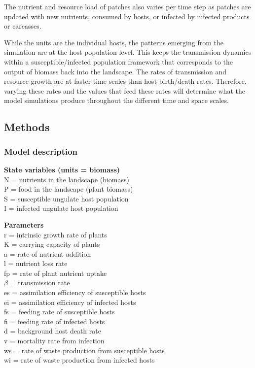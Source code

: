 \documentclass[10,portrait]{article}
\begin{document}
The nutrient and resource load of patches also varies per time step as
patches are updated with new nutrients, consumed by hosts, or infected
by infected products or carcasses.

While the units are the individual hosts, the patterns emerging from the
simulation are at the host population level. This keeps the transmission
dynamics within a susceptible/infected population framework that
corresponds to the output of biomass back into the landscape. The rates
of transmission and resource growth are at faster time scales than host
birth/death rates. Therefore, varying these rates and the values that
feed these rates will determine what the model simulations produce
throughout the different time and space scales.

\subsection{Methods}\label{methods}

\subsubsection{Model description}\label{model-description}

\textbf{State variables (units = biomass)}\\
N = nutrients in the landscape (biomass)\\
P = food in the landscape (plant biomass)\\
S = susceptible ungulate host population\\
I = infected ungulate host population

\textbf{Parameters}\\
r = intrinsic growth rate of plants\\
K = carrying capacity of plants\\
a = rate of nutrient addition\\
l = nutrient loss rate\\
fp = rate of plant nutrient uptake\\
\(\beta\) = transmission rate\\
es = assimilation efficiency of susceptible hosts\\
ei = assimilation efficiency of infected hosts\\
fs = feeding rate of susceptible hosts\\
fi = feeding rate of infected hosts\\
d = background host death rate\\
v = mortality rate from infection\\
ws = rate of waste production from susceptible hosts\\
wi = rate of waste production from infected hosts
\end{document}
